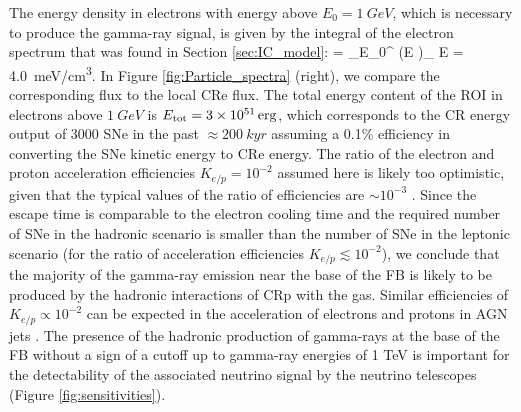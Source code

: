 The energy density in electrons with energy above $E_0 = \SI{1}{GeV}$, which is necessary to produce the gamma-ray signal, 
is given by the integral of the electron spectrum that was found in Section \ref{sec:IC_model}:
\be
{} = \int_{E_0}^{\infty} \left(E \right)_{\!\!\el} \de E = \SI{4.0}{meV/cm^3}.
\ee
In Figure \ref{fig:Particle_spectra} (right), we compare the corresponding flux to the local CRe flux.
The total energy content of the ROI in electrons above $\SI{1}{GeV}$ is $E_{\text{tot}} = \SI{3e51}{erg}$, which corresponds to the CR energy output of 3000 SNe in the past $\approx \SI{200}{kyr}$ assuming a 0.1\% efficiency in converting the SNe kinetic energy to CRe energy.
The ratio of the electron and proton acceleration efficiencies $K_{e/p} = 10^{-2}$ assumed here is likely too optimistic,
given that the typical values of the ratio of efficiencies are $\sim 10^{-3}$ \citep[e.g.,][]{2015PhRvL.114h5003P}.
Since the escape time is comparable to the electron cooling time and the required number of SNe in the hadronic
scenario is smaller than the number of SNe in the leptonic scenario (for the ratio of acceleration efficiencies $K_{e/p} \lesssim 10^{-2}$),
we conclude that the majority of the gamma-ray emission near the base of the FB 
is likely to be produced by the hadronic interactions of CRp with the gas.
Similar efficiencies of $K_{e/p} \propto 10^{-2}$ can be expected in the acceleration of 
electrons and protons in AGN jets \citep[e.g.,][]{2018arXiv180305556B}.
The presence of the hadronic production of gamma-rays at the base of the FB without a sign of a cutoff up to gamma-ray energies
of 1 TeV is important for the detectability of the associated neutrino signal by the neutrino telescopes (Figure \ref{fig:sensitivities}).

